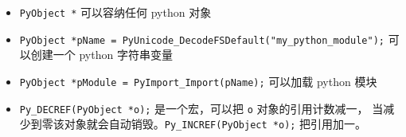 

\begin{itemize}
\item \verb`PyObject *` 可以容纳任何 python 对象
\item \verb`PyObject *pName = PyUnicode_DecodeFSDefault("my_python_module");` 可以创建一个 python 字符串变量
\item \verb`PyObject *pModule = PyImport_Import(pName);` 可以加载 python 模块
\item \verb`Py_DECREF(PyObject *o);` 是一个宏，可以把 \verb`o` 对象的引用计数减一， 当减少到零该对象就会自动销毁。\verb`Py_INCREF(PyObject *o);` 把引用加一。
\end{itemize}
